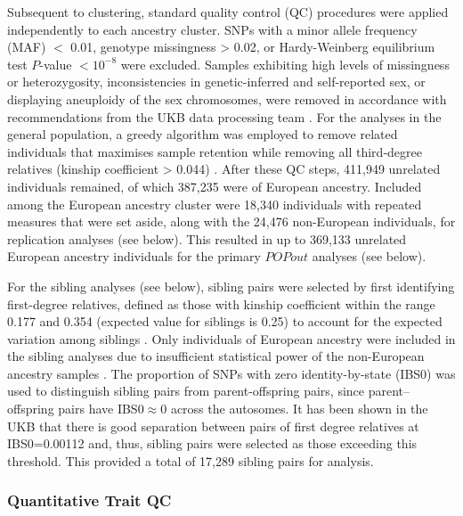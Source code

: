 \documentclass[12pt]{zHenriquesLab-StyleBioRxiv}
\begin{document}
Subsequent to clustering, standard quality control (QC) procedures
were applied independently to each ancestry cluster. SNPs with a minor
allele frequency (MAF) $<$ 0.01, genotype missingness > 0.02, or
Hardy-Weinberg equilibrium test $P$-value $< 10^{-8}$ were
excluded. Samples exhibiting high levels of missingness or
heterozygosity, inconsistencies in genetic-inferred and self-reported
sex, or displaying aneuploidy of the sex chromosomes, were removed in
accordance with recommendations from the UKB data processing team
\cite{ukb_qc}.  For the analyses in the general population, a greedy
algorithm was employed to remove related individuals that maximises
sample retention while removing all third-degree relatives (kinship
coefficient > 0.044) \cite{erase}.  After these QC steps, 411,949 unrelated    %
individuals remained, of which 387,235 were of European ancestry. Included 
among the European ancestry cluster were 18,340 individuals with repeated 
measures that were set aside, along with the 24,476 non-European individuals, 
for replication analyses (see below). This resulted in up to 369,133 unrelated 
European ancestry individuals for the primary $POPout$ analyses (see below). 

For the sibling analyses (see below), sibling pairs were selected by first
identifying first-degree relatives, defined as those with kinship
coefficient within the range 0.177 and 0.354 (expected value for
siblings is 0.25) to account for the expected variation among siblings \cite{sib1}. 
Only individuals of European ancestry were included in the sibling analyses due to 
insufficient statistical power of the non-European ancestry samples \cite{Souaiaia2024}. 
The proportion of SNPs with zero identity-by-state (IBS0) was used to distinguish 
sibling pairs from parent-offspring pairs, since parent–offspring pairs have
IBS0$\approx$0 across the autosomes. It has been shown in the UKB that
there is good separation between pairs of first degree relatives at
IBS0=0.00112 \cite{sib1} and, thus, sibling pairs were selected as
those exceeding this threshold. This provided a total of 17,289 sibling pairs 
for analysis.

\subsubsection*{Quantitative Trait QC} \label{sec:methods:traitQC} 
\end{document}

